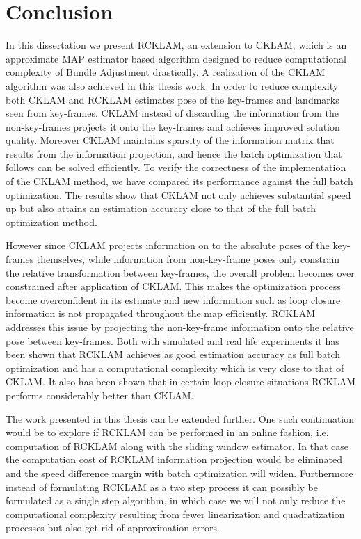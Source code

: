 \chapter{Conclusion}
\label{sec:conclusion}
In this dissertation we present RCKLAM, an extension to CKLAM, which is an approximate MAP estimator based algorithm designed to reduce computational complexity of Bundle Adjustment drastically. A realization of the CKLAM algorithm was also achieved in this thesis work. In order to reduce complexity both CKLAM and RCKLAM estimates pose of the key-frames and landmarks seen from key-frames. CKLAM instead of discarding the information from the non-key-frames projects it onto the key-frames and achieves improved solution quality. Moreover CKLAM maintains sparsity of the information matrix that results from the information projection, and hence the batch optimization that follows can be solved efficiently. To verify the correctness of the implementation of the CKLAM method, we have compared its performance against the full batch optimization. The results show that CKLAM not only achieves substantial speed up but also attains an estimation accuracy close to that of the full batch optimization method.

However since CKLAM projects information on to the absolute poses of the key-frames themselves, while information from non-key-frame poses only constrain the relative transformation between key-frames, the overall problem becomes over constrained after application of CKLAM. This makes the optimization process become overconfident in its estimate and new information such as loop closure information is not propagated throughout the map efficiently. RCKLAM addresses this issue by projecting the non-key-frame information onto the relative pose between key-frames. Both with simulated and real life experiments it has been shown that RCKLAM achieves as good estimation accuracy as full batch optimization and has a computational complexity which is very close to that of CKLAM. It also has been shown that in certain loop closure situations RCKLAM performs considerably better than CKLAM.

The work presented in this thesis can be extended further. One such continuation would be to explore if RCKLAM can be performed in an online fashion, i.e. computation of RCKLAM along with the sliding window estimator. In that case the computation cost of RCKLAM information projection would be eliminated and the speed difference margin with batch optimization will widen. Furthermore instead of formulating RCKLAM as a two step process it can possibly be formulated as a single step algorithm, in which case we will not only reduce the computational complexity resulting from fewer linearization and quadratization processes but also get rid of approximation errors.